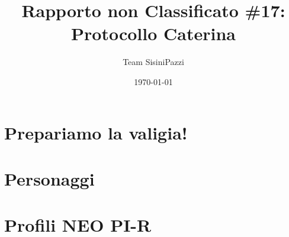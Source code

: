 \documentclass[a4paper,9pt]{book}
\title{Rapporto non Classificato \#17: Protocollo Caterina}
\author{Team SisiniPazzi}
\date{\today}
\begin{document}



\tableofcontents
\newpage



\chapter{Prepariamo la valigia!}



\chapter*{Personaggi}

\chapter*{Profili NEO PI-R}


%
\end{document}
